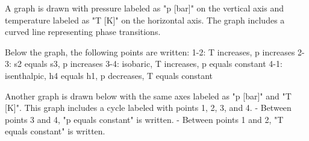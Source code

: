 A graph is drawn with pressure labeled as "p [bar]" on the vertical axis and temperature labeled as "T [K]" on the horizontal axis. The graph includes a curved line representing phase transitions.  

Below the graph, the following points are written:  
1-2: T increases, p increases  
2-3: s2 equals s3, p increases  
3-4: isobaric, T increases, p equals constant  
4-1: isenthalpic, h4 equals h1, p decreases, T equals constant  

Another graph is drawn below with the same axes labeled as "p [bar]" and "T [K]". This graph includes a cycle labeled with points 1, 2, 3, and 4.  
- Between points 3 and 4, "p equals constant" is written.  
- Between points 1 and 2, "T equals constant" is written.